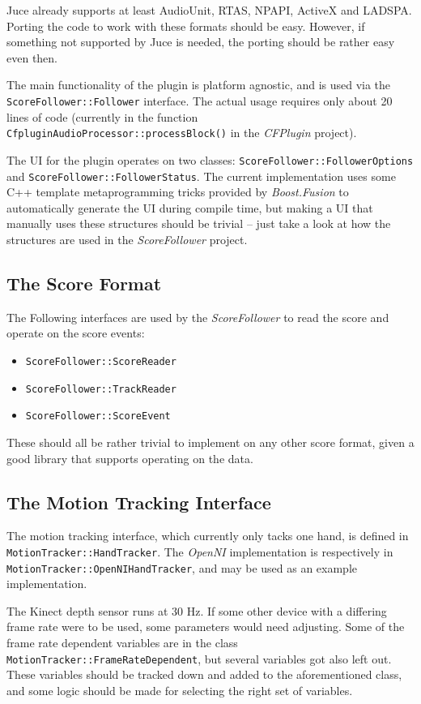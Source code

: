 \documentclass[12pt,a4paper]{article}
\begin{document}
Juce already supports at least
AudioUnit, RTAS, NPAPI, ActiveX and LADSPA.
Porting the code to work with these formats should be easy.
However, if something not supported by Juce is needed,
the porting should be rather easy even then.

The main functionality of the plugin is platform agnostic,
and is used via the \texttt{ScoreFollower::\allowbreak Follower} interface.
The actual usage requires only about 20 lines of code
(currently in the function \texttt{CfpluginAudioProcessor::\allowbreak processBlock()}
in the \textit{CFPlugin} project).

The UI for the plugin operates on two classes:
\texttt{Score\allowbreak Follower::\allowbreak Follower\allowbreak Options} and \texttt{ScoreFollower::\allowbreak FollowerStatus}.
The current implementation uses some
C++ template metaprogramming tricks provided by \textit{Boost.Fusion}
to automatically generate the UI during compile time,
but making a UI that manually uses these structures should be trivial --
just take a look at how the structures are used in the \textit{ScoreFollower} project.

\subsection{The Score Format}

The Following interfaces are used by the \textit{ScoreFollower}
to read the score and operate on the score events:
\begin{itemize}
\item \texttt{ScoreFollower::ScoreReader}
\item \texttt{ScoreFollower::TrackReader}
\item \texttt{ScoreFollower::ScoreEvent}
\end{itemize}
These should all be rather trivial to implement
on any other score format,
given a good library that supports operating on the data.

\subsection{The Motion Tracking Interface}

The motion tracking interface,
which currently only tacks one hand,
is defined in \texttt{MotionTracker::\allowbreak HandTracker}.
The \textit{OpenNI} implementation is respectively in 
\texttt{MotionTracker::\allowbreak OpenNI\allowbreak HandTracker},
and may be used as an example implementation.

The Kinect depth sensor runs at 30 Hz.
If some other device with a differing frame rate were to be used,
some parameters would need adjusting.
Some of the frame rate dependent variables are in the class
\texttt{MotionTracker::\allowbreak FrameRateDependent},
but several variables got also left out.
These variables should be tracked down and added to
the aforementioned class,
and some logic should be made for selecting
the right set of variables.
\end{document}
